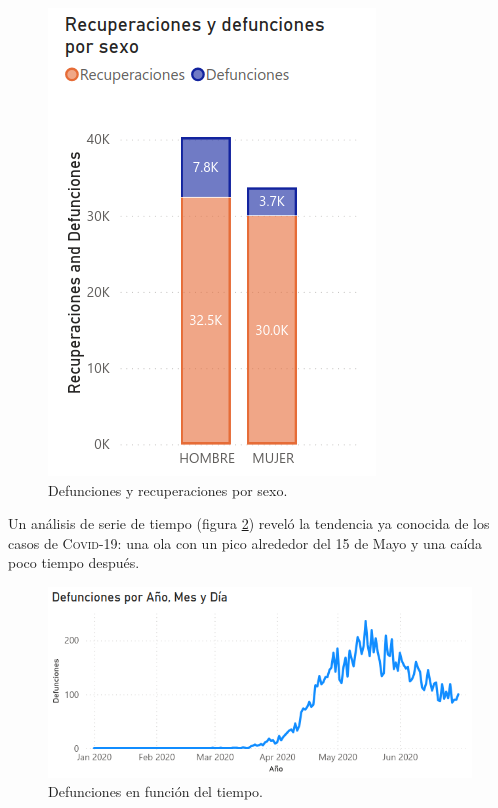 \documentclass[a4paper,12pt]{article}
\begin{document}
\begin{figure}[!ht]
    \begin{center}
	\includegraphics[scale=1]{Def_rec_por_sexo.png}
    \end{center}
    \captionsetup{width=\linewidth}
    \caption{Defunciones y recuperaciones por sexo.}
    \label{fig:def_rec_por_sexo}
\end{figure}

Un análisis de serie de tiempo (figura \ref{fig:def_por_tiempo}) reveló la tendencia ya conocida de los casos de {\scshape Covid-19}: una ola con un pico alrededor del 15 de Mayo y una caída poco tiempo después.

\begin{figure}[!ht]
    \begin{center}
	\includegraphics[scale=0.8]{Def_por_tiempo_powerbi.png}
    \end{center}
    \captionsetup{width=\linewidth}
    \caption{Defunciones en función del tiempo.}
    \label{fig:def_por_tiempo}
\end{figure}
\end{document}
